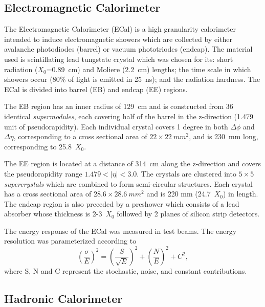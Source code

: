\subsection{Electromagnetic Calorimeter}
\label{sec:ECal}

The Electromagnetic Calorimeter (ECal) is a high granularity
calorimeter intended to induce electromagnetic showers which 
are collected by either avalanche photodiodes (barrel) or vacuum 
phototriodes (endcap).  The material used is scintillating lead 
tungstate crystal which was chosen for its: short radiation 
($X_0$=0.89~cm) and Moliere (2.2~cm) lengths; the time scale in 
which showers occur (80\% of light is emitted in 25~ns); and the
radiation hardness.  The ECal is divided into barrel (EB)
and endcap (EE) regions.

The EB region has an inner radius of 129~cm and is constructed 
from 36 identical {\it supermodules}, each covering half of the 
barrel in the z-direction (1.479 unit of pseudorapidity).  Each 
individual crystal covers 1 degree in both $\Delta\phi$ and 
$\Delta\eta$, corresponding to a cross sectional area of 
$22\times22~mm^2$, and is 230~mm long, corresponding to 25.8~$X_0$.

The EE region is located at a distance of 314~cm along the 
z-direction and covers the pseudorapidity range 
$1.479<|\eta|<3.0$.  The crystals are clustered into $5\times5$ 
{\it supercrystals} which are combined to form semi-circular 
structures.  Each crystal has a cross sectional area of 
$28.6\times28.6~mm^2$ and is 220 mm (24.7~$X_0$) in length.  
The endcap region is also preceded by a preshower which consists 
of a lead absorber whose thickness is 2-3~$X_0$ followed by 2 
planes of silicon strip detectors.

The energy response of the ECal was measured in test beams.  
The energy resolution was parameterized according to
\begin{equation}
\left(\frac{\sigma}{E}\right)^2 = \left(\frac{S}{\sqrt{E}}\right)^2 + \left(\frac{N}{E}\right)^2 + C^2,
\end{equation}
where S, N and C represent the stochastic, noise, and constant 
contributions.  

\subsection{Hadronic Calorimeter}
\label{sec:HCal}

